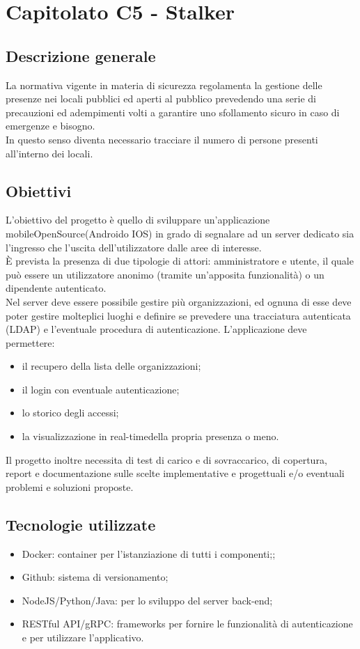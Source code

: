 \section{Capitolato C5 - Stalker}

\subsection{Descrizione generale}
La normativa vigente in materia di sicurezza regolamenta la gestione delle presenze nei locali pubblici ed aperti al pubblico prevedendo una serie di precauzioni ed adempimenti volti a garantire uno sfollamento sicuro in caso di emergenze e bisogno. \\ 
In questo senso diventa necessario tracciare il numero di persone presenti all’interno dei locali.

\subsection{Obiettivi}
L’obiettivo del progetto è quello di sviluppare un’applicazione mobile\glo OpenSource\glo (Android\glo o IOS\glo) in grado di segnalare ad un server dedicato sia l’ingresso che l’uscita dell’utilizzatore dalle aree di interesse. \\
È prevista la presenza di due tipologie di attori: amministratore e utente, il quale può essere un utilizzatore anonimo (tramite un'apposita funzionalità) o un dipendente autenticato. \\
Nel server deve essere possibile gestire più organizzazioni, ed ognuna di esse deve poter gestire molteplici luoghi e definire se prevedere una tracciatura autenticata (LDAP) e l’eventuale procedura di autenticazione.
L’applicazione deve permettere: \begin{itemize}
\item il recupero della lista delle organizzazioni;
\item il login con eventuale autenticazione;
\item lo storico degli accessi;
\item la visualizzazione in real-time\glo della propria presenza o meno.
\end{itemize}
Il progetto inoltre necessita di test di carico e di sovraccarico, di copertura, report e documentazione sulle scelte implementative e progettuali e/o eventuali problemi e soluzioni proposte.

\subsection{Tecnologie utilizzate}
\begin{itemize}
\item Docker: container per l’istanziazione di tutti i componenti;;
\item Github: sistema di versionamento\glo;
\item NodeJS/Python/Java: per lo sviluppo del server back-end\glo;
\item RESTful API/gRPC: frameworks per fornire le funzionalità di autenticazione e per utilizzare l’applicativo.
\end{itemize}

